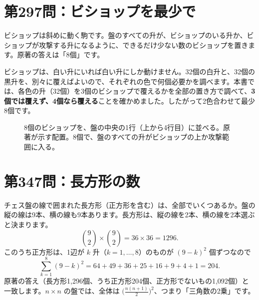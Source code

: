 \documentclass[a4paper,11pt,openany]{ltjsbook}
\begin{document}
\section{第297問：ビショップを最少で}

ビショップは斜めに動く駒です。盤のすべての升が、ビショップのいる升か、ビショップが攻撃する升になるように、できるだけ少ない数のビショップを置きます。原著の答えは「8個」です。

ビショップは、白い升にいれば白い升にしか動けません。32個の白升と、32個の黒升を、別々に覆えばよいので、それぞれの色で何個必要かを調べます。本書では、各色の升（32個）を3個のビショップで覆えるかを全部の置き方で調べて、\textbf{3個では覆えず、4個なら覆える}ことを確かめました。したがって2色合わせて最少8個です。

\begin{figure}[htbp]
\centering
{}
\caption{8個のビショップを、盤の中央の1行（上から4行目）に並べる。原著が示す配置。8個で、盤のすべての升がビショップの上か攻撃範囲に入る。}
\end{figure}

\section{第347問：長方形の数}

チェス盤の線で囲まれた長方形（正方形を含む）は、全部でいくつあるか。盤の縦の線は9本、横の線も9本あります。長方形は、縦の線を2本、横の線を2本選ぶと決まります。
\[
\binom92\times\binom92=36\times36=1296 .
\]
このうち正方形は、1辺が $k$ 升（$k=1,\ldots,8$）のものが $(9-k)^2$ 個ずつなので
\[
\sum_{k=1}^{8}(9-k)^2=64+49+36+25+16+9+4+1=204 .
\]
原著の答え（長方形1,296個、うち正方形204個、正方形でないもの1,092個）と一致します。$n\times n$ の盤では、全体は $\bigl(\tfrac{n(n+1)}{2}\bigr)^2$、つまり「三角数の2乗」です。
\end{document}
